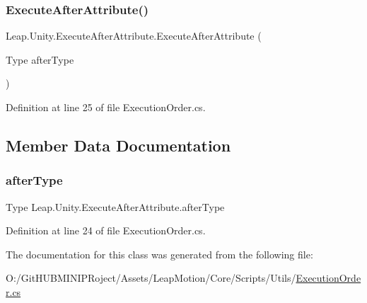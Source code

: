 \subsubsection{\texorpdfstring{ExecuteAfterAttribute()}{ExecuteAfterAttribute()}}
{\footnotesize\ttfamily Leap.\+Unity.\+Execute\+After\+Attribute.\+Execute\+After\+Attribute (\begin{DoxyParamCaption}\item[{Type}]{after\+Type }\end{DoxyParamCaption})}



Definition at line 25 of file Execution\+Order.\+cs.



\subsection{Member Data Documentation}
\mbox{\label{class_leap_1_1_unity_1_1_execute_after_attribute_a50644f274a35730d97a1d96006a2dd2a}} 
\subsubsection{\texorpdfstring{afterType}{afterType}}
{\footnotesize\ttfamily Type Leap.\+Unity.\+Execute\+After\+Attribute.\+after\+Type}



Definition at line 24 of file Execution\+Order.\+cs.



The documentation for this class was generated from the following file\+:\begin{DoxyCompactItemize}
\item 
O\+:/\+Git\+H\+U\+B\+M\+I\+N\+I\+P\+Roject/\+Assets/\+Leap\+Motion/\+Core/\+Scripts/\+Utils/\mbox{\hyperlink{_execution_order_8cs}{Execution\+Order.\+cs}}\end{DoxyCompactItemize}
